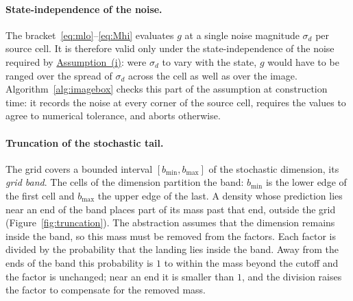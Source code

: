 \documentclass[11pt,a4paper]{article}
\theoremstyle{plain}
\theoremstyle{remark}
\begin{document}
	\paragraph{State-independence of the noise.}
	The bracket~\eqref{eq:mlo}--\eqref{eq:Mhi} evaluates $g$ at a single
	noise magnitude $\sigma_d$ per source cell. It is therefore valid
	only under the state-independence of the noise required by
	\hyperref[ass:sysclass]{Assumption~(i)}: were $\sigma_d$ to vary with
	the state, $g$ would have to be ranged over the spread of $\sigma_d$
	across the cell as well as over the image.
	Algorithm~\ref{alg:imagebox} checks this part of the assumption at
	construction time: it records the noise at every corner of the source
	cell, requires the values to agree to numerical tolerance, and aborts
	otherwise.

	
	\paragraph{Truncation of the stochastic tail.}
	The grid covers a bounded interval $[b_{\min}, b_{\max}]$ of the
	stochastic dimension, its \emph{grid band}. The cells of the
	dimension partition the band: $b_{\min}$ is the lower edge of the
	first cell and $b_{\max}$ the upper edge of the last. A density whose
	prediction lies near an end of the band places part of its mass past
	that end, outside the grid (Figure~\ref{fig:truncation}). The
	abstraction assumes that the dimension remains inside the band, so
	this mass must be removed from the factors. Each factor is divided by
	the probability that the landing lies inside the band. Away from the	ends of the band this probability is $1$ to within the mass beyond the cutoff and the factor is unchanged;	near an end it is smaller than $1$, and the division raises the
	factor to compensate for the removed mass.
	
\end{document}
